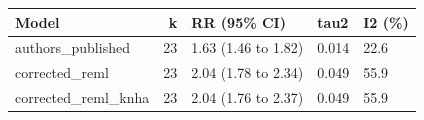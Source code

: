 
\begin{tabular}{lrlll}
\toprule
Model & k & RR (95\% CI) & tau2 & I2 (\%)\\
\midrule
authors\_published & 23 & 1.63 (1.46 to 1.82) & 0.014 & 22.6\\
corrected\_reml & 23 & 2.04 (1.78 to 2.34) & 0.049 & 55.9\\
corrected\_reml\_knha & 23 & 2.04 (1.76 to 2.37) & 0.049 & 55.9\\
\bottomrule
\end{tabular}

